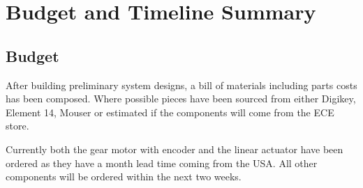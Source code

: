 \chapter{Budget and Timeline Summary}

\section{Budget}
After building preliminary system designs, a bill of materials including parts
costs has been composed. Where possible pieces have been sourced from either Digikey,
Element 14, Mouser or estimated if the components will come from the ECE store.

Currently both the gear motor with encoder and the linear actuator have been
ordered as they have a month lead time coming from the USA. All other components
will be ordered within the next two weeks.

